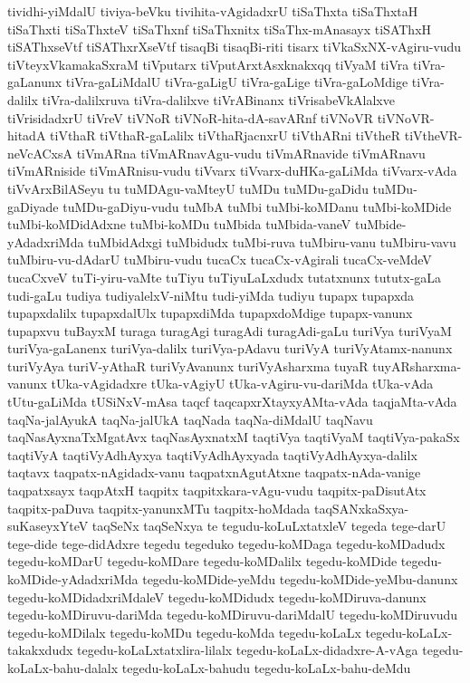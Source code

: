 {tividhi-yiMdalU
tiviya-beVku
tivihita-vAgidadxrU
tiSaThxta
tiSaThxtaH
tiSaThxti
tiSaThxteV
tiSaThxnf
tiSaThxnitx
tiSaThx-mAnasayx
tiSAThxH
tiSAThxseVtf
tiSAThxrXseVtf
tisaqBi
tisaqBi-riti
tisarx
tiVkaSxNX-vAgiru-vudu
tiVteyxVkamakaSxraM
tiVputarx
tiVputArxtAsxknakxqq
tiVyaM
tiVra
tiVra-gaLanunx
tiVra-gaLiMdalU
tiVra-gaLigU
tiVra-gaLige
tiVra-gaLoMdige
tiVra-dalilx
tiVra-dalilxruva
tiVra-dalilxve
tiVrABinanx
tiVrisabeVkAlalxve
tiVrisidadxrU
tiVreV
tiVNoR
tiVNoR-hita-dA-savARnf
tiVNoVR
tiVNoVR-hitadA
tiVthaR
tiVthaR-gaLalilx
tiVthaRjacnxrU
tiVthARni
tiVtheR
tiVtheVR-neVcACxsA
tiVmARna
tiVmARnavAgu-vudu
tiVmARnavide
tiVmARnavu
tiVmARniside
tiVmARnisu-vudu
tiVvarx
tiVvarx-duHKa-gaLiMda
tiVvarx-vAda
tiVvArxBilASeyu
tu
tuMDAgu-vaMteyU
tuMDu
tuMDu-gaDidu
tuMDu-gaDiyade
tuMDu-gaDiyu-vudu
tuMbA
tuMbi
tuMbi-koMDanu
tuMbi-koMDide
tuMbi-koMDidAdxne
tuMbi-koMDu
tuMbida
tuMbida-vaneV
tuMbide-yAdadxriMda
tuMbidAdxgi
tuMbidudx
tuMbi-ruva
tuMbiru-vanu
tuMbiru-vavu
tuMbiru-vu-dAdarU
tuMbiru-vudu
tucaCx
tucaCx-vAgirali
tucaCx-veMdeV
tucaCxveV
tuTi-yiru-vaMte
tuTiyu
tuTiyuLaLxdudx
tutatxnunx
tututx-gaLa
tudi-gaLu
tudiya
tudiyalelxV-niMtu
tudi-yiMda
tudiyu
tupapx
tupapxda
tupapxdalilx
tupapxdalUlx
tupapxdiMda
tupapxdoMdige
tupapx-vanunx
tupapxvu
tuBayxM
turaga
turagAgi
turagAdi
turagAdi-gaLu
turiVya
turiVyaM
turiVya-gaLanenx
turiVya-dalilx
turiVya-pAdavu
turiVyA
turiVyAtamx-nanunx
turiVyAya
turiV-yAthaR
turiVyAvanunx
turiVyAsharxma
tuyaR
tuyARsharxma-vanunx
tUka-vAgidadxre
tUka-vAgiyU
tUka-vAgiru-vu-dariMda
tUka-vAda
tUtu-gaLiMda
tUSiNxV-mAsa
taqcf
taqcapxrXtayxyAMta-vAda
taqjaMta-vAda
taqNa-jalAyukA
taqNa-jalUkA
taqNada
taqNa-diMdalU
taqNavu
taqNasAyxnaTxMgatAvx
taqNasAyxnatxM
taqtiVya
taqtiVyaM
taqtiVya-pakaSx
taqtiVyA
taqtiVyAdhAyxya
taqtiVyAdhAyxyada
taqtiVyAdhAyxya-dalilx
taqtavx
taqpatx-nAgidadx-vanu
taqpatxnAgutAtxne
taqpatx-nAda-vanige
taqpatxsayx
taqpAtxH
taqpitx
taqpitxkara-vAgu-vudu
taqpitx-paDisutAtx
taqpitx-paDuva
taqpitx-yanunxMTu
taqpitx-hoMdada
taqSANxkaSxya-suKaseyxYteV
taqSeNx
taqSeNxya
te
tegudu-koLuLxtatxleV
tegeda
tege-darU
tege-dide
tege-didAdxre
tegedu
tegeduko
tegedu-koMDaga
tegedu-koMDadudx
tegedu-koMDarU
tegedu-koMDare
tegedu-koMDalilx
tegedu-koMDide
tegedu-koMDide-yAdadxriMda
tegedu-koMDide-yeMdu
tegedu-koMDide-yeMbu-danunx
tegedu-koMDidadxriMdaleV
tegedu-koMDidudx
tegedu-koMDiruva-danunx
tegedu-koMDiruvu-dariMda
tegedu-koMDiruvu-dariMdalU
tegedu-koMDiruvudu
tegedu-koMDilalx
tegedu-koMDu
tegedu-koMda
tegedu-koLaLx
tegedu-koLaLx-takakxdudx
tegedu-koLaLxtatxlira-lilalx
tegedu-koLaLx-didadxre-A-vAga
tegedu-koLaLx-bahu-dalalx
tegedu-koLaLx-bahudu
tegedu-koLaLx-bahu-deMdu
}
